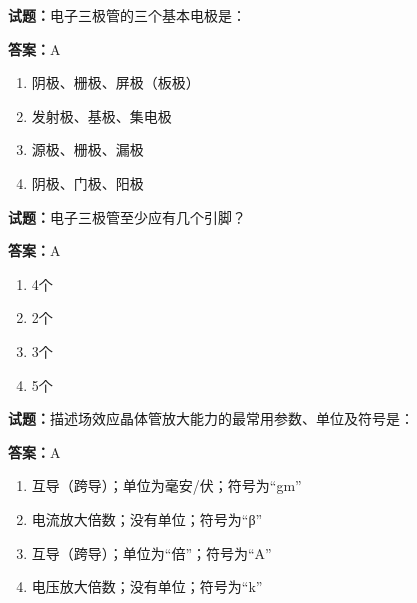 \documentclass{ctexbook}
\begin{document}




\vspace{1em}

\textbf{试题：}电子三极管的三个基本电极是： 

\textbf{答案：}A 

\begin{enumerate}[leftmargin=3em]
  \item 阴极、栅极、屏极（板极） 

  \item 发射极、基极、集电极 

  \item 源极、栅极、漏极 

  \item 阴极、门极、阳极 


\end{enumerate}





\vspace{1em}

\textbf{试题：}电子三极管至少应有几个引脚？ 

\textbf{答案：}A 

\begin{enumerate}[leftmargin=3em]
  \item 4个 

  \item 2个 

  \item 3个 

  \item 5个 

\end{enumerate}





\vspace{1em}

\textbf{试题：}描述场效应晶体管放大能力的最常用参数、单位及符号是： 

\textbf{答案：}A 

\begin{enumerate}[leftmargin=3em]
  \item 互导（跨导）；单位为毫安/伏；符号为“gm” 

  \item 电流放大倍数；没有单位；符号为“β” 

  \item 互导（跨导）；单位为“倍”；符号为“A” 

  \item 电压放大倍数；没有单位；符号为“k” 

\end{enumerate}
\end{document}
